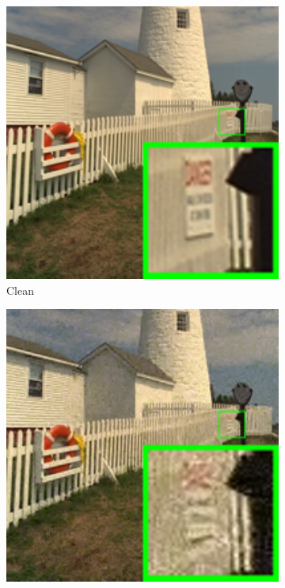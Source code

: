 \begin{figure}
\begin{subfigure}[t]{0.19\textwidth}
        \includegraphics[width=1\textwidth]{images/mcwnnm/24images/resize_br_kodim19.png}
		\caption{Clean}
    \end{subfigure}
    \hfill
    \begin{subfigure}[t]{0.19\textwidth}
        \centering
        \includegraphics[width=1\textwidth]{images/mcwnnm/24images/resize_br_CBM3D_nSig301050_kodim19.png}

\end{subfigure}
\end{figure}
